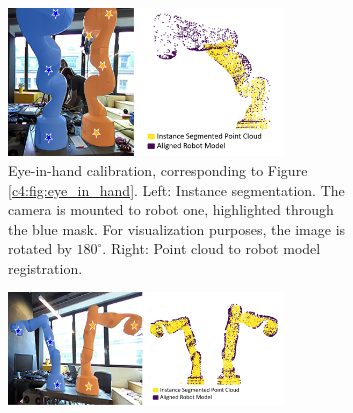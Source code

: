 




\begin{figure}
     \centering
     \begin{subfigure}[b]{\textwidth}
         \centering
         \includegraphics[width=0.8\textwidth]{img/visual_calibration/self_registration_combined_white.png}
         \caption{Eye-in-hand calibration, corresponding to Figure \ref{c4:fig:eye_in_hand}. Left: Instance segmentation. The camera is mounted to robot one, highlighted through the blue mask. For visualization purposes, the image is rotated by $180^{\circ}$. Right: Point cloud to robot model registration.}
         \label{c4:fig:self_registration}
     \end{subfigure}
     \hfill
     \begin{subfigure}[b]{\textwidth}
         \centering
         \includegraphics[width=0.8\textwidth]{img/visual_calibration/double_registration_combined_white.png}

\end{subfigure}
\end{figure}
